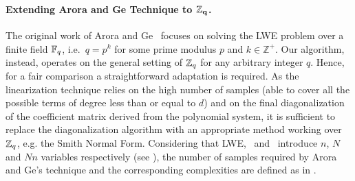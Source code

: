 %   

\paragraph{Extending Arora and Ge Technique to \(\boldsymbol{\mathbb{Z}}_\mathbf{q}\).}
The original work of Arora and Ge~\cite{ICALP:AroGe11} focuses on solving the LWE problem over a finite field \(\mathbb{F}_q\), i.e.\ \(q=p^k\) for some prime modulus \(p\) and \(k\in\mathbb{Z}^+\). Our algorithm, instead, operates on the general setting of \(\mathbb{Z}_q\) for any arbitrary integer \(q\). Hence, for a fair comparison a straightforward adaptation is required. As the linearization technique relies on the high number of samples (able to cover all the possible terms of degree less than or equal to $d$) and on the final diagonalization of the coefficient matrix derived from the polynomial system, it is sufficient to replace the diagonalization algorithm with an appropriate method working over \(\mathbb{Z}_q\), e.g. the Smith Normal Form. 
Considering that LWE, \rlwe\ and \mlwe\ introduce $n$, $N$ and $Nn$ variables respectively (see ), the number of samples required by Arora and Ge's technique and the corresponding complexities are defined as in .



